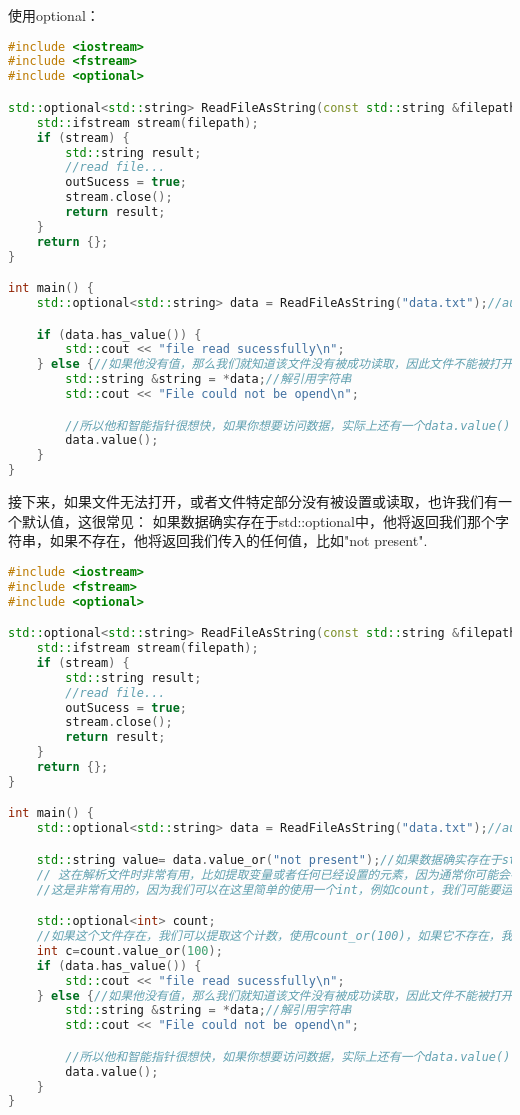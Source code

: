 使用optional：

\begin{lstlisting}[language=c++]
#include <iostream>
#include <fstream>
#include <optional>

std::optional<std::string> ReadFileAsString(const std::string &filepath) {
    std::ifstream stream(filepath);
    if (stream) {
        std::string result;
        //read file...
        outSucess = true;
        stream.close();
        return result;
    }
    return {};
}

int main() {
    std::optional<std::string> data = ReadFileAsString("data.txt");//auto data = ReadFileAsString("data.txt");

    if (data.has_value()) {
        std::cout << "file read sucessfully\n";
    } else {//如果他没有值，那么我们就知道该文件没有被成功读取，因此文件不能被打开
        std::string &string = *data;//解引用字符串
        std::cout << "File could not be opend\n";

        //所以他和智能指针很想快，如果你想要访问数据，实际上还有一个data.value()可以用
        data.value();
    }
}
\end{lstlisting}

接下来，如果文件无法打开，或者文件特定部分没有被设置或读取，也许我们有一个默认值，这很常见：
如果数据确实存在于{\ncodestyle std::optional}中，他将返回我们那个字符串，如果不存在，他将返回我们传入的任何值，比如"not present".

\begin{lstlisting}[language=c++]
#include <iostream>
#include <fstream>
#include <optional>

std::optional<std::string> ReadFileAsString(const std::string &filepath) {
    std::ifstream stream(filepath);
    if (stream) {
        std::string result;
        //read file...
        outSucess = true;
        stream.close();
        return result;
    }
    return {};
}

int main() {
    std::optional<std::string> data = ReadFileAsString("data.txt");//auto data = ReadFileAsString("data.txt");

    std::string value= data.value_or("not present");//如果数据确实存在于std::optional中，他将返回给我们那个字符串，比如"not present"
    // 这在解析文件时非常有用，比如提取变量或者任何已经设置的元素，因为通常你可能会在文件中有一些东西是可选的，如果某个参数没有在文件中设置，你可以使用你指定的默认值
    //这是非常有用的，因为我们可以在这里简单的使用一个int，例如count，我们可能要运行一个基准测试，在文件中有我们在基准测试中的次数，

    std::optional<int> count;
    //如果这个文件存在，我们可以提取这个计数，使用count_or(100)，如果它不存在，我们可以使用默认的100；
    int c=count.value_or(100);
    if (data.has_value()) {
        std::cout << "file read sucessfully\n";
    } else {//如果他没有值，那么我们就知道该文件没有被成功读取，因此文件不能被打开
        std::string &string = *data;//解引用字符串
        std::cout << "File could not be opend\n";

        //所以他和智能指针很想快，如果你想要访问数据，实际上还有一个data.value()可以用
        data.value();
    }
}
\end{lstlisting}



